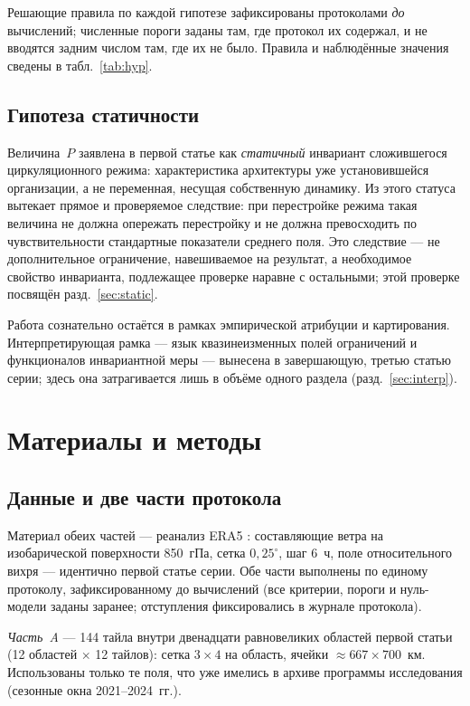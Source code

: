 \documentclass[11pt,a4paper]{article}
\begin{document}
Решающие правила по каждой гипотезе зафиксированы протоколами \emph{до} вычислений; численные пороги заданы там, где протокол их содержал, и не вводятся задним числом там, где их не было. Правила и наблюдённые значения сведены в табл.~\ref{tab:hyp}.

\subsection{Гипотеза статичности}

Величина~$P$ заявлена в первой статье как \emph{статичный} инвариант сложившегося циркуляционного режима: характеристика архитектуры уже установившейся организации, а не переменная, несущая собственную динамику. Из этого статуса вытекает прямое и проверяемое следствие: при перестройке режима такая величина не должна опережать перестройку и не должна превосходить по чувствительности стандартные показатели среднего поля. Это следствие --- не дополнительное ограничение, навешиваемое на результат, а необходимое свойство инварианта, подлежащее проверке наравне с остальными; этой проверке посвящён разд.~\ref{sec:static}.

Работа сознательно остаётся в рамках эмпирической атрибуции и картирования. Интерпретирующая рамка --- язык квазинеизменных полей ограничений и функционалов инвариантной меры --- вынесена в завершающую, третью статью серии; здесь она затрагивается лишь в объёме одного раздела (разд.~\ref{sec:interp}).

\section{Материалы и методы}
\label{sec:data}

\subsection{Данные и две части протокола}

Материал обеих частей --- реанализ ERA5 \cite{Hersbach2020,Soci2024}: составляющие ветра на изобарической поверхности 850~гПа, сетка $0{,}25^\circ$, шаг 6~ч, поле относительного вихря --- идентично первой статье серии. Обе части выполнены по единому протоколу, зафиксированному до вычислений (все критерии, пороги и нуль-модели заданы заранее; отступления фиксировались в журнале протокола).

\emph{Часть~A} --- 144 тайла внутри двенадцати равновеликих областей первой статьи (12 областей $\times$ 12 тайлов): сетка $3\times4$ на область, ячейки $\approx667\times700$~км. Использованы только те поля, что уже имелись в архиве программы исследования (сезонные окна 2021--2024~гг.).
\end{document}
